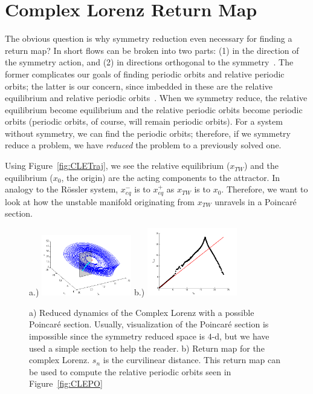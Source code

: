 \documentclass[12 pt]{article}
\begin{document}
\section{Complex Lorenz Return Map}
\label{sec:CLE}
The obvious question is why symmetry reduction even necessary for finding
a return map?  In short flows can be broken into two parts: (1) in the
direction of the symmetry action, and (2) in directions orthogonal to the
symmetry~\cite{CB, Eth, Atl}.  The former complicates our goals of
finding periodic orbits and relative periodic orbits; the latter is our
concern, since imbedded in these are the relative equilibrium and
relative periodic orbits~\cite{Atl}.  When we symmetry reduce, the
relative equilibrium become equilibrium and the relative periodic orbits
become periodic orbits (periodic orbits, of course, will remain periodic
orbits).  For a system without symmetry, we can find the periodic orbits;
therefore, if we symmetry reduce a problem, we have \emph{reduced} the
problem to a previously solved one.

Using Figure~\ref{fig:CLETraj}, we see the relative equilibrium
($x_{TW}$) and the equilibrium ($x_0$, the origin) are the acting
components to the attractor.  In analogy to the R\"ossler system,
$x_{eq}^{-}$ is to $x_{eq}^{+}$ as $x_{TW}$ is to $x_0$.  Therefore, we
want to look at how the unstable manifold originating from $x_{TW}$
unravels in a Poincar\'e section.
\begin{figure}[h]
\centering
a.)  \includegraphics[width=0.35\textwidth]{Figs/Section3/kcCLEredaxisonPSc.png}
b.)
  \includegraphics[width=0.35\textwidth]{Figs/Section3/kcCLEretmap.png}
\caption{ a) Reduced dynamics of the Complex Lorenz with a possible
Poincar\'e section.  Usually, visualization of the Poincar\'e section is
impossible since the symmetry reduced space is $4$-d, but we have used a
simple section to help the reader. b) Return map for the complex Lorenz.
$s_n$ is the curvilinear distance.  This return map can be used to
compute the relative periodic orbits seen in Figure~\ref{fig:CLEPO}
}
 \label{fig:CLEretmap}
\end{figure}
\end{document}
